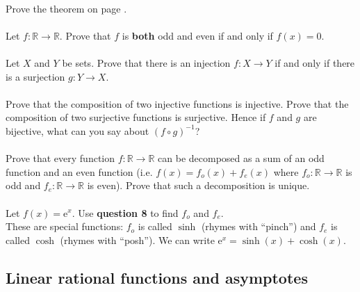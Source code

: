 \documentclass[12pt, a4paper, titlepage, twoside]{article}
\newcommand*{\R}{\mathbb{R}}
\newcommand*{\e}{\textrm{e}}
\begin{document}
	\paragraph{}
	Prove the theorem on page \pageref*{fun-prop-ex}.
	
	\paragraph{}
	Let $f : \R \to \R$. Prove that $f$ is \textbf{both} odd and even if and only if $f(x) = 0$.
	
	\paragraph{}
	Let $X$ and $Y$ be sets. Prove that there is an injection $f : X \to Y$ if and only if there is a surjection $g : Y \to X$.
	
	\paragraph{}
	Prove that the composition of two injective functions is injective. Prove that the composition of two surjective functions is surjective.
	Hence if $f$ and $g$ are bijective, what can you say about $(f \circ g)^{-1}$?
	
	\paragraph{}
	Prove that every function $f : \R \to \R$ can be decomposed as a sum of an odd function and an even function (i.e. $f(x) = f_o(x) + f_e(x)$
	where $f_o : \R \to \R$ is odd and $f_e : \R \to \R$ is even). Prove that such a decomposition is unique.
	
	\paragraph{}
	Let $f(x) = \e^x$. Use \textbf{question 8} to find $f_o$ and $f_e$. \\ These are special functions: $f_o$ is called $\sinh$ (rhymes with 
	``pinch'') and $f_e$ is called $\cosh$ (rhymes with ``posh''). We can write $\e^x = \sinh(x) + \cosh(x)$.
	
	\newpage 
	
	\subsection{Linear rational functions and asymptotes}
	
\end{document}
